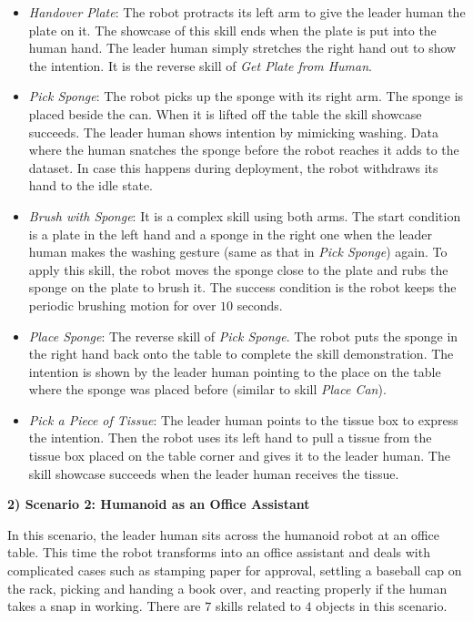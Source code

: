 \begin{itemize}[leftmargin=*]
    \item \textit{Handover Plate}: The robot protracts its left arm to give the leader human the plate on it.
    The showcase of this skill ends when the plate is put into the human hand.
    The leader human simply stretches the right hand out to show the intention.
    It is the reverse skill of \textit{Get Plate from Human}.
    
    \item \textit{Pick Sponge}: The robot picks up the sponge with its right arm. 
    The sponge is placed beside the can.
    When it is lifted off the table the skill showcase succeeds.
    The leader human shows intention by mimicking washing.
    Data where the human snatches the sponge before the robot reaches it adds to the dataset. 
    In case this happens during deployment, the robot withdraws its hand to the idle state.

    \item \textit{Brush with Sponge}: It is a complex skill using both arms.
    The start condition is a plate in the left hand and a sponge in the right one when the leader human makes the washing gesture (same as that in \textit{Pick Sponge}) again.
    To apply this skill, the robot moves the sponge close to the plate and rubs the sponge on the plate to brush it.
    The success condition is the robot keeps the periodic brushing motion for over $10$ seconds.

    \item \textit{Place Sponge}: The reverse skill of \textit{Pick Sponge}.
    The robot puts the sponge in the right hand back onto the table to complete the skill demonstration.
    The intention is shown by the leader human pointing to the place on the table where the sponge was placed before (similar to skill \textit{Place Can}).

    \item \textit{Pick a Piece of Tissue}: The leader human points to the tissue box to express the intention. 
    Then the robot uses its left hand to pull a tissue from the tissue box placed on the table corner and gives it to the leader human.
    The skill showcase succeeds when the leader human receives the tissue.
\end{itemize}



\noindent\textbf{2) Scenario 2: Humanoid as an Office Assistant}

In this scenario, the leader human sits across the humanoid robot at an office table.
This time the robot transforms into an office assistant and deals with complicated cases such as stamping paper for approval, settling a baseball cap on the rack, picking and handing a book over, and reacting properly if the human takes a snap in working.
There are $7$ skills related to $4$ objects in this scenario.

